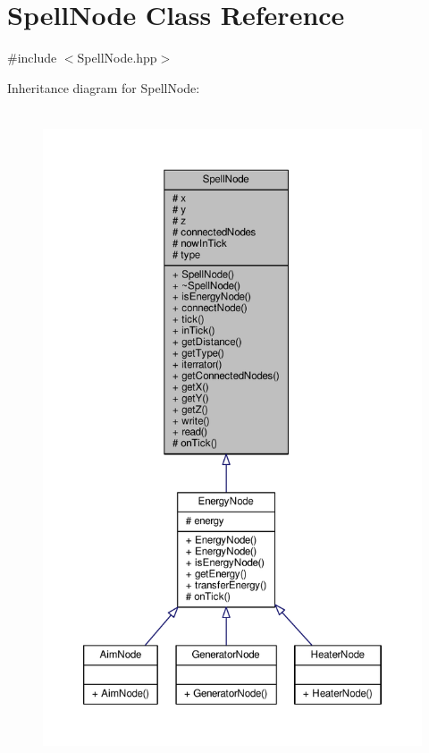 \hypertarget{class_spell_node}{\section{Spell\-Node Class Reference}
\label{class_spell_node}
}


{\ttfamily \#include $<$Spell\-Node.\-hpp$>$}



Inheritance diagram for Spell\-Node\-:
\nopagebreak
\begin{figure}[H]
\begin{center}
\leavevmode
\includegraphics[height=550pt]{class_spell_node__inherit__graph}
\end{center}
\end{figure}


